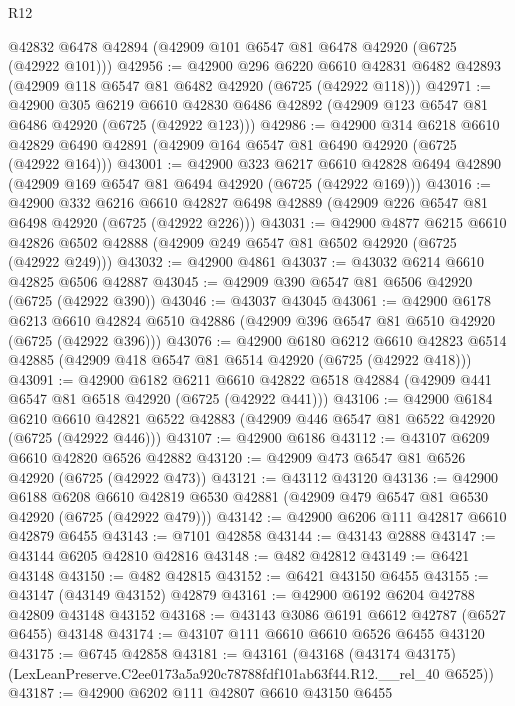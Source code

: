 \begin{lexlean}{R12}
\begin{coremodule}
    @42832
    @6478
    @42894
    (@42909 @101 @6547 @81 @6478 @42920 (@6725 (@42922 @101)))
@42956 := @42900
    @296
    @6220
    @6610
    @42831
    @6482
    @42893
    (@42909 @118 @6547 @81 @6482 @42920 (@6725 (@42922 @118)))
@42971 := @42900
    @305
    @6219
    @6610
    @42830
    @6486
    @42892
    (@42909 @123 @6547 @81 @6486 @42920 (@6725 (@42922 @123)))
@42986 := @42900
    @314
    @6218
    @6610
    @42829
    @6490
    @42891
    (@42909 @164 @6547 @81 @6490 @42920 (@6725 (@42922 @164)))
@43001 := @42900
    @323
    @6217
    @6610
    @42828
    @6494
    @42890
    (@42909 @169 @6547 @81 @6494 @42920 (@6725 (@42922 @169)))
@43016 := @42900
    @332
    @6216
    @6610
    @42827
    @6498
    @42889
    (@42909 @226 @6547 @81 @6498 @42920 (@6725 (@42922 @226)))
@43031 := @42900
    @4877
    @6215
    @6610
    @42826
    @6502
    @42888
    (@42909 @249 @6547 @81 @6502 @42920 (@6725 (@42922 @249)))
@43032 := @42900 @4861
@43037 := @43032 @6214 @6610 @42825 @6506 @42887
@43045 := @42909 @390 @6547 @81 @6506 @42920 (@6725 (@42922 @390))
@43046 := @43037 @43045
@43061 := @42900
    @6178
    @6213
    @6610
    @42824
    @6510
    @42886
    (@42909 @396 @6547 @81 @6510 @42920 (@6725 (@42922 @396)))
@43076 := @42900
    @6180
    @6212
    @6610
    @42823
    @6514
    @42885
    (@42909 @418 @6547 @81 @6514 @42920 (@6725 (@42922 @418)))
@43091 := @42900
    @6182
    @6211
    @6610
    @42822
    @6518
    @42884
    (@42909 @441 @6547 @81 @6518 @42920 (@6725 (@42922 @441)))
@43106 := @42900
    @6184
    @6210
    @6610
    @42821
    @6522
    @42883
    (@42909 @446 @6547 @81 @6522 @42920 (@6725 (@42922 @446)))
@43107 := @42900 @6186
@43112 := @43107 @6209 @6610 @42820 @6526 @42882
@43120 := @42909 @473 @6547 @81 @6526 @42920 (@6725 (@42922 @473))
@43121 := @43112 @43120
@43136 := @42900
    @6188
    @6208
    @6610
    @42819
    @6530
    @42881
    (@42909 @479 @6547 @81 @6530 @42920 (@6725 (@42922 @479)))
@43142 := @42900 @6206 @111 @42817 @6610 @42879 @6455
@43143 := @7101 @42858
@43144 := @43143 @2888
@43147 := @43144 @6205 @42810 @42816
@43148 := @482 @42812
@43149 := @6421 @43148
@43150 := @482 @42815
@43152 := @6421 @43150 @6455
@43155 := @43147 (@43149 @43152) @42879
@43161 := @42900 @6192 @6204 @42788 @42809 @43148 @43152
@43168 := @43143 @3086 @6191 @6612 @42787 (@6527 @6455) @43148
@43174 := @43107 @111 @6610 @6610 @6526 @6455 @43120
@43175 := @6745 @42858
@43181 := @43161
    (@43168 (@43174 @43175) (LexLeanPreserve.C2ee0173a5a920c78788fdf101ab63f44.R12.__rel_40 @6525))
@43187 := @42900 @6202 @111 @42807 @6610 @43150 @6455

\end{coremodule}
\end{lexlean}
